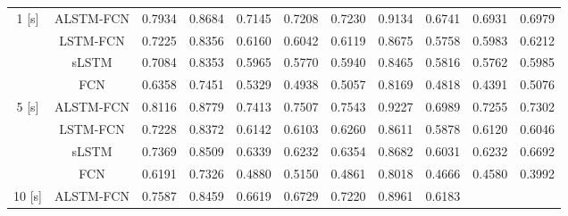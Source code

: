 \documentclass{ieeeaccess}
\begin{document}
\begin{table}[htbp!]
\begin{tabular*}{0.9\textwidth}{c|c|c|cccc|cccc}
\multirow{4}{*}{1   [s]} &
  ALSTM-FCN &
  0.7934 &
  \multicolumn{1}{c|}{0.8684} &
  \multicolumn{1}{c|}{0.7145} &
  \multicolumn{1}{c|}{0.7208} &
  0.7230 &
  \multicolumn{1}{c|}{0.9134} &
  \multicolumn{1}{c|}{0.6741} &
  \multicolumn{1}{c|}{0.6931} &
  0.6979 \\ \cline{2-11} 
 &
  LSTM-FCN &
  0.7225 &
  \multicolumn{1}{c|}{0.8356} &
  \multicolumn{1}{c|}{0.6160} &
  \multicolumn{1}{c|}{0.6042} &
  0.6119 &
  \multicolumn{1}{c|}{0.8675} &
  \multicolumn{1}{c|}{0.5758} &
  \multicolumn{1}{c|}{0.5983} &
  0.6212 \\ \cline{2-11} 
 &
  sLSTM &
  0.7084 &
  \multicolumn{1}{c|}{0.8353} &
  \multicolumn{1}{c|}{0.5965} &
  \multicolumn{1}{c|}{0.5770} &
  0.5940 &
  \multicolumn{1}{c|}{0.8465} &
  \multicolumn{1}{c|}{0.5816} &
  \multicolumn{1}{c|}{0.5762} &
  0.5985 \\ \cline{2-11} 
 &
  FCN &
  0.6358 &
  \multicolumn{1}{c|}{0.7451} &
  \multicolumn{1}{c|}{0.5329} &
  \multicolumn{1}{c|}{0.4938} &
  0.5057 &
  \multicolumn{1}{c|}{0.8169} &
  \multicolumn{1}{c|}{0.4818} &
  \multicolumn{1}{c|}{0.4391} &
  0.5076 \\ \hline
\multirow{4}{*}{5   [s]} &
  ALSTM-FCN &
  0.8116 &
  \multicolumn{1}{c|}{0.8779} &
  \multicolumn{1}{c|}{0.7413} &
  \multicolumn{1}{c|}{0.7507} &
  0.7543 &
  \multicolumn{1}{c|}{0.9227} &
  \multicolumn{1}{c|}{0.6989} &
  \multicolumn{1}{c|}{0.7255} &
  0.7302 \\ \cline{2-11} 
 &
  LSTM-FCN &
  0.7228 &
  \multicolumn{1}{c|}{0.8372} &
  \multicolumn{1}{c|}{0.6142} &
  \multicolumn{1}{c|}{0.6103} &
  0.6260 &
  \multicolumn{1}{c|}{0.8611} &
  \multicolumn{1}{c|}{0.5878} &
  \multicolumn{1}{c|}{0.6120} &
  0.6046 \\ \cline{2-11} 
 &
  sLSTM &
  0.7369 &
  \multicolumn{1}{c|}{0.8509} &
  \multicolumn{1}{c|}{0.6339} &
  \multicolumn{1}{c|}{0.6232} &
  0.6354 &
  \multicolumn{1}{c|}{0.8682} &
  \multicolumn{1}{c|}{0.6031} &
  \multicolumn{1}{c|}{0.6232} &
  0.6692 \\ \cline{2-11} 
 &
  FCN &
  0.6191 &
  \multicolumn{1}{c|}{0.7326} &
  \multicolumn{1}{c|}{0.4880} &
  \multicolumn{1}{c|}{0.5150} &
  0.4861 &
  \multicolumn{1}{c|}{0.8018} &
  \multicolumn{1}{c|}{0.4666} &
  \multicolumn{1}{c|}{0.4580} &
  0.3992 \\ \hline
\multirow{4}{*}{10   [s]} &
  ALSTM-FCN &
  0.7587 &
  \multicolumn{1}{c|}{0.8459} &
  \multicolumn{1}{c|}{0.6619} &
  \multicolumn{1}{c|}{0.6729} &
  0.7220 &
  \multicolumn{1}{c|}{0.8961} &
  \multicolumn{1}{c|}{0.6183} &

\end{tabular*}
\end{table}
\end{document}
